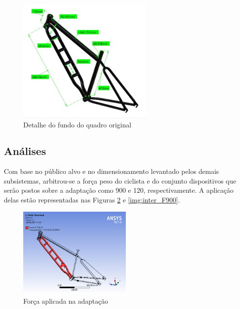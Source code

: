 	
	\graphicspath{{figuras/}}
	\begin{figure}[!htb]
		\centering
		\includegraphics[width=0.6\textwidth]{inter_cotas.jpg}
		\caption{Detalhe do fundo do quadro original}
		\label{img:inter_cotas}
	\end{figure}
	
	\subsection{Análises}
	
	Com base no público alvo e no dimensionamento levantado pelos demais subsistemas, arbitrou-se a força peso do ciclista e do conjunto dispositivos que serão postos sobre a adaptação como 900 e 120, respectivamente. A aplicação delas estão representadas nas Figuras \ref{img:inter_F120} e \ref{img:inter_F900}. 
	
	
	\begin{figure}[!htb]
		\centering
		\includegraphics[width=0.5\textwidth]{inter_F120.png}
		\caption{Força aplicada na adaptação}
		\label{img:inter_F120}
	\end{figure}
	
